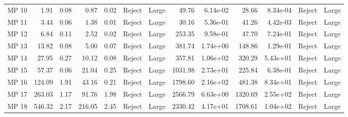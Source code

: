 \begin{tabular}{lrrrrllrrrrll}
 MP 10 &               1.91 &  0.08 &                0.87 &  0.02 &   Reject &       Large &                    49.76 &  6.14e-02 &                     28.66 &  8.34e-04 &   Reject &       Large \\
 MP 11 &               3.44 &  0.06 &                1.38 &  0.01 &   Reject &       Large &                    30.16 &  5.36e-01 &                     41.26 &  4.42e-03 &   Reject &       Large \\
 MP 12 &               6.84 &  0.11 &                2.52 &  0.02 &   Reject &       Large &                   253.35 &  9.58e-01 &                     47.70 &  7.24e-01 &   Reject &       Large \\
 MP 13 &              13.82 &  0.08 &                5.00 &  0.07 &   Reject &       Large &                   381.74 &  1.74e+00 &                    148.86 &  1.29e-01 &   Reject &       Large \\
 MP 14 &              27.95 &  0.27 &               10.12 &  0.08 &   Reject &       Large &                   357.81 &  1.06e+02 &                    320.29 &  5.43e+01 &   Reject &       Large \\
 MP 15 &              57.37 &  0.06 &               21.04 &  0.25 &   Reject &       Large &                  1031.98 &  2.73e+01 &                    225.84 &  6.38e-01 &   Reject &       Large \\
 MP 16 &             124.09 &  1.91 &               43.16 &  0.21 &   Reject &       Large &                  1798.60 &  2.16e+02 &                    481.38 &  8.34e+01 &   Reject &       Large \\
 MP 17 &             263.03 &  1.17 &               91.76 &  1.98 &   Reject &       Large &                  2566.79 &  6.63e+00 &                   1320.69 &  2.55e+02 &   Reject &       Large \\
 MP 18 &             546.32 &  2.17 &              216.05 &  2.45 &   Reject &       Large &                  2330.42 &  4.17e+01 &                   1708.61 &  1.04e+02 &   Reject &       Large \\
\bottomrule
\end{tabular}
